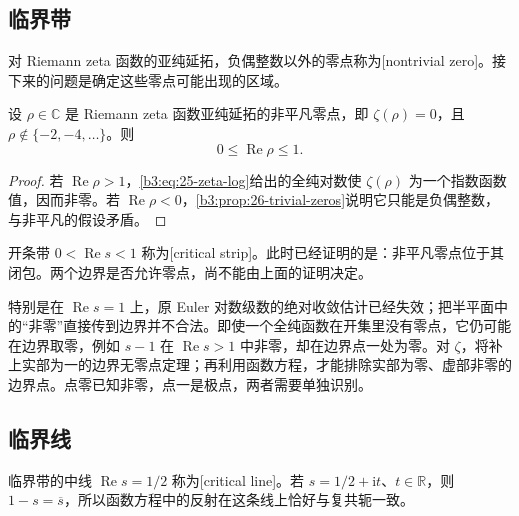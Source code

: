 \subsection{临界带}
\label{b3:subsec:260502}

对 Riemann zeta 函数的亚纯延拓，负偶整数以外的零点称为[nontrivial zero]。接下来的问题是确定这些零点可能出现的区域。

\begin{proposition}[非平凡零点的初步范围]\label{b3:prop:26-zero-strip}
设 \(\rho\in\mathbb C\) 是 Riemann zeta 函数亚纯延拓的非平凡零点，即 \(\zeta(\rho)=0\)，且 \(\rho\notin\{-2,-4,\ldots\}\)。则
\[
 0\le\operatorname{Re}\rho\le1.
\]
\end{proposition}
\begin{proof}
若 \(\operatorname{Re}\rho>1\)，\eqref{b3:eq:25-zeta-log}给出的全纯对数使 \(\zeta(\rho)\) 为一个指数函数值，因而非零。若 \(\operatorname{Re}\rho<0\)，\cref{b3:prop:26-trivial-zeros}说明它只能是负偶整数，与非平凡的假设矛盾。
\end{proof}

开条带 \(0<\operatorname{Re}s<1\) 称为[critical strip]。此时已经证明的是：非平凡零点位于其闭包。两个边界是否允许零点，尚不能由上面的证明决定。

特别是在 \(\operatorname{Re}s=1\) 上，原 Euler 对数级数的绝对收敛估计已经失效；把半平面中的“非零”直接传到边界并不合法。即使一个全纯函数在开集里没有零点，它仍可能在边界取零，例如 \(s-1\) 在 \(\operatorname{Re}s>1\) 中非零，却在边界点一处为零。对 \(\zeta\)，将补上实部为一的边界无零点定理；再利用函数方程，才能排除实部为零、虚部非零的边界点。点零已知非零，点一是极点，两者需要单独识别。

\subsection{临界线}
\label{b3:subsec:260503}

临界带的中线 \(\operatorname{Re}s=1/2\) 称为[critical line]。若 \(s=1/2+\mathrm it\)、\(t\in\mathbb R\)，则 \(1-s=\overline s\)，所以函数方程中的反射在这条线上恰好与复共轭一致。

